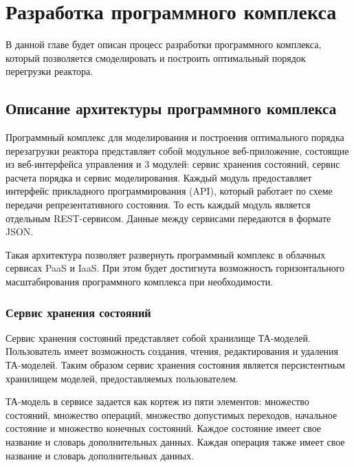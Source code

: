 \chapter{Разработка программного комплекса}

В данной главе будет описан процесс разработки программного комплекса, который позволяется смоделировать и  построить оптимальный порядок перегрузки реактора.

\section{Описание архитектуры программного комплекса}

Программный комплекс для моделирования и построения оптимального порядка перезагрузки реактора представляет собой модульное веб-приложение, состоящие из веб-интерфейса управления и 3 модулей: сервис хранения состояний, сервис расчета порядка и сервис моделирования.
Каждый модуль предоставляет интерфейс прикладного программирования (API), который работает по схеме передачи репрезентативного состояния. 
То есть каждый модуль является отдельным REST-сервисом.
Данные между сервисами передаются в формате JSON.

Такая архитектура позволяет развернуть программный комплекс в облачных сервисах PaaS и IaaS.
При этом будет достигнута возможность горизонтального масштабирования программного комплекса при необходимости.

\subsection{Сервис хранения состояний}

Сервис хранения состояний представляет собой хранилище ТА-моделей.
Пользователь имеет возможность создания, чтения, редактирования и удаления ТА-моделей.
Таким образом сервис хранения состояния является персистентным хранилищем моделей, предоставляемых пользователем.

ТА-модель в сервисе задается как кортеж из пяти элементов: множество состояний, множество операций, множество допустимых переходов, начальное состояние и множество конечных состояний.
Каждое состояние имеет свое название и словарь дополнительных данных.
Каждая операция также имеет свое название и словарь дополнительных данных.

